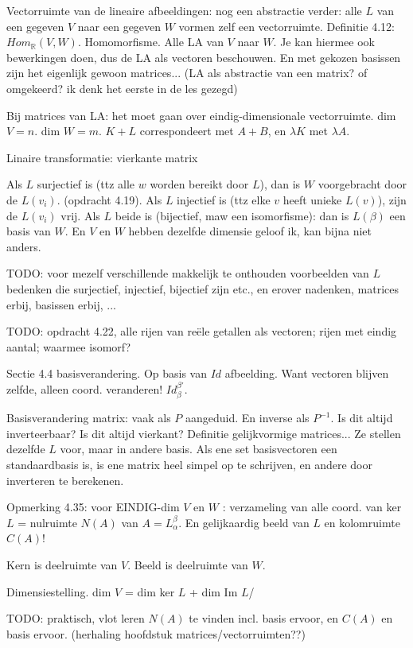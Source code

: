 \documentclass{article}
\begin{document}
Vectorruimte van de lineaire afbeeldingen: nog een abstractie verder: alle $L$ van een gegeven $V$ naar een gegeven $W$ vormen zelf een vectorruimte. 
Definitie 4.12: $Hom_{\mathbb{R}}(V,W)$. Homomorfisme. Alle LA van $V$ naar $W$. Je kan hiermee ook bewerkingen doen, dus de LA als vectoren beschouwen. 
En met gekozen basissen zijn het eigenlijk gewoon matrices... 
(LA als abstractie van een matrix? of omgekeerd? ik denk het eerste in de les gezegd) 

Bij matrices van LA: het moet gaan over eindig-dimensionale vectorruimte. dim $V = n$. dim $W = m$. $K+L$ correspondeert met $A+B$, en $\lambda K$ met $\lambda A$. 

Linaire transformatie: vierkante matrix

Als $L$ surjectief is (ttz alle $w$ worden bereikt door $L$), dan is $W$ voorgebracht door de $L(v_i)$. (opdracht 4.19). 
Als $L$ injectief is (ttz elke $v$ heeft unieke $L(v)$), zijn de $L(v_i)$ vrij. 
Als $L$ beide is (bijectief, maw een isomorfisme): dan is $L(\beta)$ een basis van $W$. En $V$ en $W$ hebben dezelfde dimensie geloof ik, kan bijna niet anders. 

TODO: voor mezelf verschillende makkelijk te onthouden voorbeelden van $L$ bedenken die surjectief, injectief, bijectief zijn etc., en erover nadenken, matrices erbij, basissen erbij, ... 

TODO: opdracht 4.22, alle rijen van re\"ele getallen als vectoren; rijen met eindig aantal; waarmee isomorf? 

Sectie 4.4 basisverandering. Op basis van $Id$ afbeelding. Want vectoren blijven zelfde, alleen coord. veranderen! $Id_{\beta}^{\beta'}$. 

Basisverandering matrix: vaak als $P$ aangeduid. En inverse als $P^{-1}$. Is dit altijd inverteerbaar? Is dit altijd vierkant? Definitie gelijkvormige matrices... Ze stellen dezelfde $L$ voor, maar in andere basis. 
Als ene set basisvectoren een standaardbasis is, is ene matrix heel simpel op te schrijven, en andere door inverteren te berekenen. 

Opmerking 4.35: voor EINDIG-dim $V$ en $W$ : verzameling van alle coord. van ker $L$ = nulruimte $N(A)$ van $A = L_{\alpha}^{\beta}$. En gelijkaardig beeld van $L$ en kolomruimte $C(A)$! 

Kern is deelruimte van $V$. Beeld is deelruimte van $W$. 

Dimensiestelling. dim $V$ = dim ker $L$ + dim Im $L$/ 

TODO: praktisch, vlot leren $N(A)$ te vinden incl. basis ervoor, en $C(A)$ en basis ervoor. (herhaling hoofdstuk matrices/vectorruimten??) 
\end{document}
